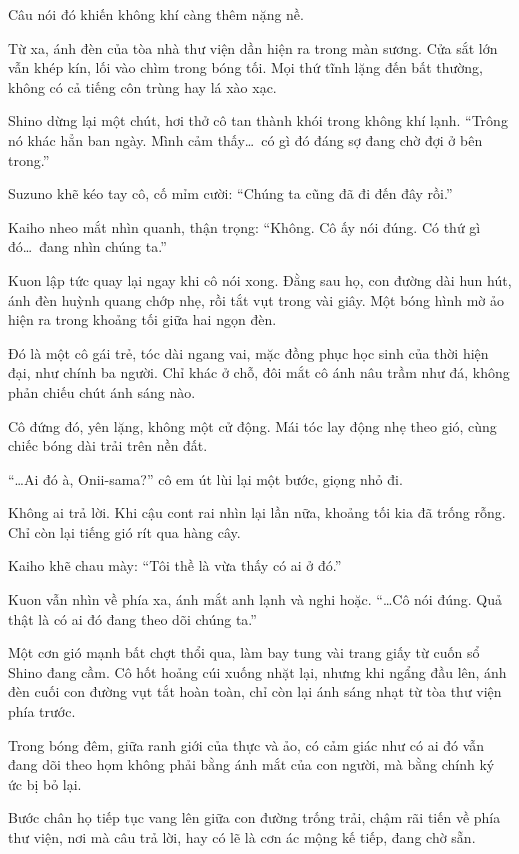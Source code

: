 \documentclass[../main.tex]{subfiles}
\begin{document}
Câu nói đó khiến không khí càng thêm nặng nề.

Từ xa, ánh đèn của tòa nhà thư viện dần hiện ra trong màn sương. Cửa sắt lớn vẫn khép kín, lối vào chìm trong bóng tối. Mọi thứ tĩnh lặng đến bất thường, không có cả tiếng côn trùng hay lá xào xạc.

Shino dừng lại một chút, hơi thở cô tan thành khói trong không khí lạnh.
``Trông nó khác hẳn ban ngày. Mình cảm thấy\dots\ có gì đó đáng sợ đang chờ đợi ở bên trong.''

Suzuno khẽ kéo tay cô, cố mỉm cười: ``Chúng ta cũng đã đi đến đây rồi.''

Kaiho nheo mắt nhìn quanh, thận trọng: ``Không. Cô ấy nói đúng. Có thứ gì đó\dots\ đang nhìn chúng ta.''

Kuon lập tức quay lại ngay khi cô nói xong. Đằng sau họ, con đường dài hun hút, ánh đèn huỳnh quang chớp nhẹ, rồi tắt vụt trong vài giây. Một bóng hình mờ ảo hiện ra trong khoảng tối giữa hai ngọn đèn.

Đó là một cô gái trẻ, tóc dài ngang vai, mặc đồng phục học sinh của thời hiện đại, như chính ba người. Chỉ khác ở chỗ, đôi mắt cô ánh nâu trầm như đá, không phản chiếu chút ánh sáng nào.

Cô đứng đó, yên lặng, không một cử động. Mái tóc lay động nhẹ theo gió, cùng chiếc bóng dài trải trên nền đất.

``\dots Ai đó à, Onii-sama?'' cô em út lùi lại một bước, giọng nhỏ đi.

Không ai trả lời. Khi cậu cont rai nhìn lại lần nữa, khoảng tối kia đã trống rỗng. Chỉ còn lại tiếng gió rít qua hàng cây.

Kaiho khẽ chau mày: ``Tôi thề là vừa thấy có ai ở đó.''

Kuon vẫn nhìn về phía xa, ánh mắt anh lạnh và nghi hoặc. ``\dots Cô nói đúng. Quả thật là có ai đó đang theo dõi chúng ta.''

Một cơn gió mạnh bất chợt thổi qua, làm bay tung vài trang giấy từ cuốn sổ Shino đang cầm. Cô hốt hoảng cúi xuống nhặt lại, nhưng khi ngẩng đầu lên, ánh đèn cuối con đường vụt tắt hoàn toàn, chỉ còn lại ánh sáng nhạt từ tòa thư viện phía trước.

Trong bóng đêm, giữa ranh giới của thực và ảo, có cảm giác như có ai đó vẫn đang dõi theo họm không phải bằng ánh mắt của con người, mà bằng chính ký ức bị bỏ lại.

Bước chân họ tiếp tục vang lên giữa con đường trống trải, chậm rãi tiến về phía thư viện, nơi mà câu trả lời, hay có lẽ là cơn ác mộng kế tiếp, đang chờ sẵn.
\end{document}
